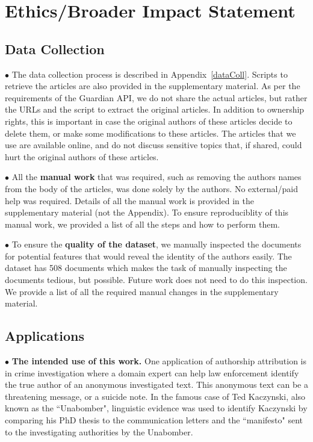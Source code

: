 \documentclass[11pt]{article}
\begin{document}
\newpage
\section{Ethics/Broader Impact Statement}
\subsection{Data Collection}
\noindent$\bullet$ The data collection process is described in Appendix~\ref{dataColl}. Scripts to retrieve the articles are also provided in the supplementary material. As per the requirements of the Guardian API, we do not share the actual articles, but rather the URLs and the script to extract the original articles. In addition to ownership rights, this is important in case the original authors of these articles decide to delete them, or make some modifications to these articles. The articles that we use are available online, and do not discuss sensitive topics that, if shared, could hurt the original authors of these articles. 

\noindent$\bullet$ All the \textbf{manual work} that was required, such as removing the authors names from the body of the articles, was done solely by the authors. No external/paid help was required. Details of all the manual work is provided in the supplementary material (not the Appendix). To ensure reproduciblity of this manual work, we provided a list of all the steps and how to perform them. 

\noindent$\bullet$ To ensure the \textbf{quality of the dataset}, we manually inspected the documents for potential features that would reveal the identity of the authors easily. The dataset has 508 documents which makes the task of manually inspecting the documents tedious, but possible. Future work does not need to do this inspection. We provide a list of all the required manual changes in the supplementary material. 

\subsection{Applications}
\noindent$\bullet$ \textbf{The intended use of this work.} One application of authorship attribution is in crime investigation where a domain expert can help law enforcement identify the true author of an anonymous investigated text. This anonymous text can be a threatening message, or a suicide note. In the famous case of Ted Kaczynski, also known as the ``Unabomber", linguistic evidence was used to identify Kaczynski by comparing his PhD thesis to the communication letters and the ``manifesto" sent to the investigating authorities by the Unabomber. 
\end{document}
